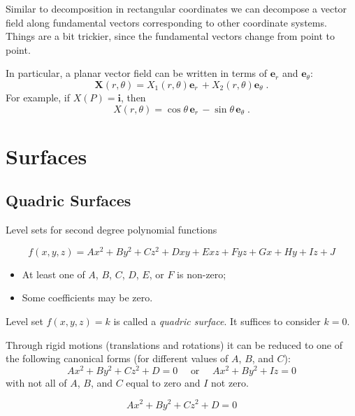Similar to decomposition in rectangular coordinates
we can decompose a vector field along fundamental vectors
corresponding to other coordinate systems. Things are a bit
trickier, since the fundamental vectors change from
point to point.

In particular, a planar vector field can be written in terms of
$\textbf{e}_r$ and $\textbf{e}_\theta$:
%
$$\textbf{X}(r,\theta) = X_1(r,\theta) \textbf{e}_r\, +
X_2(r,\theta) \textbf{e}_\theta\; .$$
%
For example, if $X(P) = \textbf{i}$, then
%
$$X(r,\theta) = \cos\theta \,\textbf{e}_r\,
-\sin\theta \, \textbf{e}_\theta\; .$$





\section{Surfaces}

\subsection{Quadric Surfaces}

Level sets for second degree polynomial functions

$$f(x,y,z) = Ax^2+By^2+Cz^2+Dxy+Exz+Fyz+Gx+Hy+Iz+J$$

\begin{itemize}
  \item At least one of $A$, $B$, $C$, $D$, $E$, or $F$ is non-zero;
  \item Some coefficients may be zero.
\end{itemize}

Level set $f(x,y,z)=k$ is called a \emph{quadric surface}. It suffices to consider $k=0$.

Through rigid motions (translations and rotations) it can be reduced to one of the following canonical forms (for different values of $A$, $B$, and $C$):
%
$$
  Ax^2+By^2+Cz^2+D = 0 \quad \text{ or } \quad
  Ax^2+By^2+Iz=0
$$
%
with not all of $A$, $B$, and $C$ equal to zero and $I$ not zero.

\begin{equation*}
Ax^2+By^2+Cz^2+D = 0
\end{equation*}

